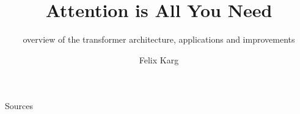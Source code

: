 \usepackage[ngerman, english]{babel}


\title{Attention is All You Need}
\subtitle{overview of the transformer architecture, applications and improvements}
\author{Felix Karg}


\graphicspath{ {./img/} {../template/} {../template_tex/} } %

\newif\iftwocols
\twocolstrue





\newif\ifonline
\onlinefalse


% 

% 
% 







\begin{frame}{Sources}
% 


\end{frame}

% 


